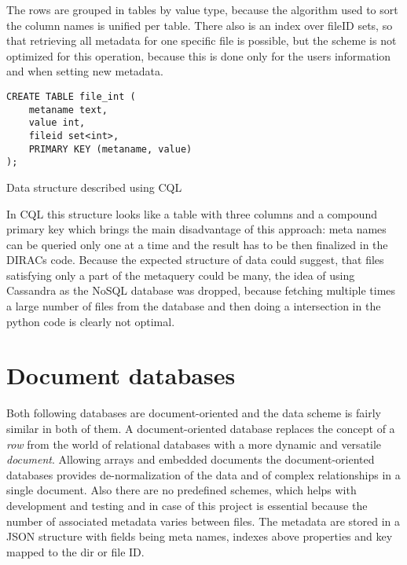 The rows are grouped in tables by value type, because the algorithm used to sort the
column names is unified per table. There also is an index over fileID sets, 
so that retrieving all metadata for one specific file is possible, but the scheme is 
not optimized for this operation, because this is done only for the users information and
when setting new metadata.

\begin{listing}
\begin{verbatim}
CREATE TABLE file_int (
    metaname text,
    value int,
    fileid set<int>,
    PRIMARY KEY (metaname, value)
);
\end{verbatim}
\caption{Data structure described using CQL}
\end{listing}

In CQL this structure looks like a table with three columns and a compound primary key which
brings the main disadvantage of this approach: meta names can be queried only one at a time and
the result has to be then finalized in the DIRACs code. Because the expected structure of data could
suggest, that files satisfying only a part of the metaquery could be many, the idea of using 
Cassandra as the NoSQL database was dropped, because fetching multiple times a large number of 
files from the database and then doing a intersection in the python code is clearly not optimal. 


\section{Document databases}

Both following databases are document-oriented and the data scheme is fairly similar in both
of them. A document-oriented database replaces the concept of a \textit{row} from the world of relational 
databases with a more dynamic and versatile \textit{document}. Allowing arrays and embedded documents the 
document-oriented databases provides de-normalization of the data and  of complex 
relationships in a single document. Also there are no predefined schemes, which helps with development 
and testing and in case of this project is essential because the number of associated metadata varies between 
files. The metadata are stored in a JSON structure with fields being meta names, indexes above properties and key 
mapped to the dir or file ID.



